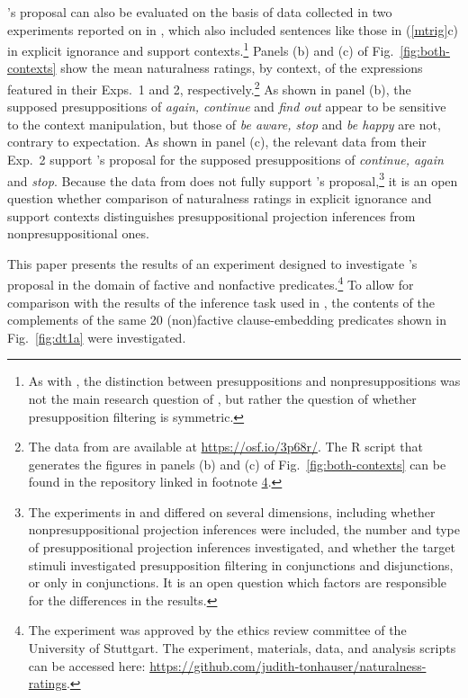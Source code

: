 \documentclass[11pt,fleqn]{article}
\newcommand{\6}{\mbox{$[\hspace*{-.6mm}[$}}
\newcommand{\9}{\mbox{$]\hspace*{-.6mm}]$}}
\newcommand{\citepos}[1]{\citeauthor{#1}'s \citeyear{#1}}
\begin{document}
\citepos{mandelkern-etal2020} proposal can also be evaluated on the basis of data collected in two experiments reported on in \citealt{kalomoiros-schwarz2024}, which also included sentences like those in (\ref{mtrig}c) in explicit ignorance and support contexts.\footnote{As with \citealt{mandelkern-etal2020}, the distinction between presuppositions and nonpresuppositions was not the main research question of \citealt{kalomoiros-schwarz2024}, but rather the question of whether presupposition filtering is symmetric.} Panels (b) and (c) of Fig.~\ref{fig:both-contexts} show the mean naturalness ratings, by context, of the expressions featured in their Exps.~1 and 2, respectively.\footnote{The data from \citealt{kalomoiros-schwarz2024} are available at \url{https://osf.io/3p68r/}. The R script that generates the figures in panels (b) and (c) of Fig.~\ref{fig:both-contexts} can be found in the repository linked in footnote \ref{f:github}.} As shown in panel (b), the supposed presuppositions of \emph{again, continue} and \emph{find out} appear to be sensitive to the context manipulation, but those of \emph{be aware, stop} and \emph{be happy} are not, contrary to expectation. As shown in panel (c), the relevant data from their Exp.~2 support \citepos{mandelkern-etal2020} proposal for the supposed presuppositions of \emph{continue, again} and \emph{stop}. Because the data from \citealt[Exp.~1]{kalomoiros-schwarz2024} does not fully support \citepos{mandelkern-etal2020} proposal,\footnote{The experiments in \citealt{mandelkern-etal2020} and \citealt{kalomoiros-schwarz2024} differed on several dimensions, including whether nonpresuppositional projection inferences were included, the number and type of presuppositional projection inferences investigated, and whether the target stimuli investigated presupposition filtering in conjunctions and disjunctions, or only in conjunctions. It is an open question which factors are responsible for the differences in the results.} it is an open question whether comparison of naturalness ratings in explicit ignorance and support contexts distinguishes presuppositional projection inferences from nonpresuppositional ones.

This paper presents the results of an experiment designed to investigate \citepos{mandelkern-etal2020} proposal in the domain of factive and nonfactive predicates.\footnote{\label{f:github}The experiment was approved by the ethics review committee of the University of Stuttgart. The experiment, materials, data, and analysis scripts can be accessed here:  \url{https://github.com/judith-tonhauser/naturalness-ratings}.}  To allow for comparison with the results of the inference task used in \citealt{degen-tonhauser-language},  the contents of the complements of the same 20 (non)factive clause-embedding predicates shown in Fig.~\ref{fig:dt1a} were investigated. 
\end{document}
